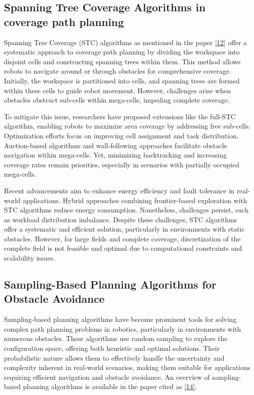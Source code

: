 \subsection{Spanning Tree Coverage Algorithms in coverage path planning}

Spanning Tree Coverage (STC) algorithms as mentioned in the paper \hyperlink{cite.spanning_tree}{[12]} offer a systematic approach to coverage path planning by dividing the workspace into disjoint cells and constructing spanning trees within them. This method allows robots to navigate around or through obstacles for comprehensive coverage. Initially, the workspace is partitioned into cells, and spanning trees are formed within these cells to guide robot movement. However, challenges arise when obstacles obstruct sub-cells within mega-cells, impeding complete coverage.

\vspace*{6mm}

To mitigate this issue, researchers have proposed extensions like the full-STC algorithm, enabling robots to maximize area coverage by addressing free sub-cells. Optimization efforts focus on improving cell assignment and task distribution. Auction-based algorithms and wall-following approaches facilitate obstacle navigation within mega-cells. Yet, minimizing backtracking and increasing coverage rates remain priorities, especially in scenarios with partially occupied mega-cells.

\vspace*{6mm}

Recent advancements aim to enhance energy efficiency and fault tolerance in real-world applications. Hybrid approaches combining frontier-based exploration with STC algorithms reduce energy consumption. Nonetheless, challenges persist, such as workload distribution imbalance. Despite these challenges, STC algorithms offer a systematic and efficient solution, particularly in environments with static obstacles. However, for large fields and complete coverage, discretization of the complete field is not feasible and optimal due to computational constraints and scalability issues.





\subsection{Sampling-Based Planning Algorithms for Obstacle Avoidance}

Sampling-based planning algorithms have become prominent tools for solving complex path planning problems in robotics, particularly in environments with numerous obstacles. These algorithms use random sampling to explore the configuration space, offering both heuristic and optimal solutions. Their probabilistic nature allows them to effectively handle the uncertainty and complexity inherent in real-world scenarios, making them suitable for applications requiring efficient navigation and obstacle avoidance. An overview of sampling-based planning algorithms is available in the paper cited as \hyperlink{cite.sampling_based_more_related}{[14]}.

